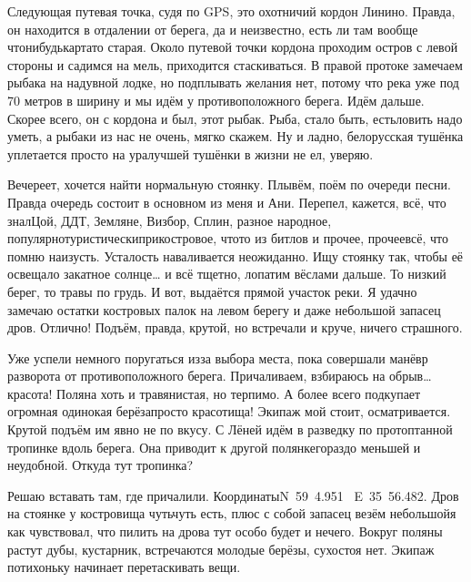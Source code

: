 Следующая путевая точка, судя по GPS, это охотничий кордон Линино. Правда, он находится в отдалении от берега, да и неизвестно, есть ли там вообще что\sdash нибудь\mdash карта\sdash то старая. Около путевой точки кордона проходим остров с левой стороны и садимся на мель, приходится стаскиваться. В правой протоке замечаем рыбака на надувной лодке, но подплывать желания нет, потому что река уже под 70 метров в ширину и мы идём у противоположного берега. Идём дальше. Скорее всего, он с кордона и был, этот рыбак. Рыба, стало быть, есть\mdash ловить надо уметь, а рыбаки из нас не очень, мягко скажем. Ну и ладно, белорусская тушёнка уплетается просто на ура\mdash лучшей тушёнки в жизни не ел, уверяю.

Вечереет, хочется найти нормальную стоянку. Плывём, поём по очереди песни. Правда очередь состоит в основном из меня и Ани. Перепел, кажется, всё, что знал\mdash Цой, ДДТ, Земляне, Визбор, Сплин, разное народное, популярно\sdash туристически\sdash прикостровое, что\sdash то из битлов и прочее, прочее\mdash всё, что помню наизусть. Усталость наваливается неожиданно. Ищу стоянку так, чтобы её освещало закатное солнце… и всё тщетно, лопатим вёслами дальше. То низкий берег, то травы по грудь. И вот, выдаётся прямой участок реки. Я удачно замечаю остатки костровых палок на левом берегу и даже небольшой запасец дров. Отлично! Подъём, правда, крутой, но встречали и круче, ничего страшного.

Уже успели немного поругаться из\sdash за выбора места, пока совершали манёвр разворота от противоположного берега. Причаливаем, взбираюсь на обрыв… красота! Поляна хоть и травянистая, но терпимо. А более всего подкупает огромная одинокая берёза\mdash просто красотища! Экипаж мой стоит, осматривается. Крутой подъём им явно не по вкусу. С Лёней идём в разведку по протоптанной тропинке вдоль берега. Она приводит к другой полянке\mdash гораздо меньшей и неудобной. Откуда тут тропинка? 

Решаю вставать там, где причалили. Координаты\mdash N~59\degree~4.951\textprime~ E~35\degree~56.482\textprime. Дров на стоянке у костровища чуть\sdash чуть есть, плюс с собой запасец везём небольшой\mdash я как чувствовал, что пилить на дрова тут особо будет и нечего. Вокруг поляны растут дубы, кустарник, встречаются молодые берёзы, сухостоя нет. Экипаж потихоньку начинает перетаскивать вещи. 

